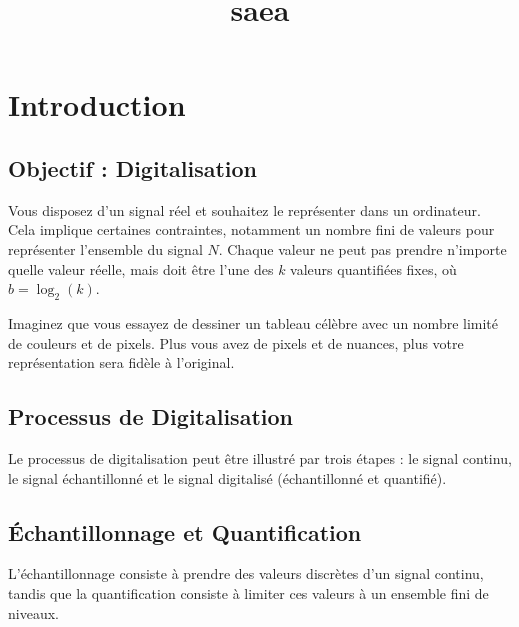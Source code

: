 \documentclass[12pt]{article}
\title{saea}
\author{}
\date{}
\begin{document}
\maketitle
\tableofcontents
\newpage

\section{Introduction}

\subsection{Objectif : Digitalisation}

Vous disposez d'un signal réel et souhaitez le représenter dans un ordinateur. Cela implique certaines contraintes, notamment un nombre fini de valeurs pour représenter l'ensemble du signal $N$. Chaque valeur ne peut pas prendre n'importe quelle valeur réelle, mais doit être l'une des $k$ valeurs quantifiées fixes, où $b = \log_2(k)$.


\begin{tcolorbox}[title={Vulgarisation simple}]
Imaginez que vous essayez de dessiner un tableau célèbre avec un nombre limité de couleurs et de pixels. Plus vous avez de pixels et de nuances, plus votre représentation sera fidèle à l'original.
\end{tcolorbox}

\subsection{Processus de Digitalisation}

Le processus de digitalisation peut être illustré par trois étapes : le signal continu, le signal échantillonné et le signal digitalisé (échantillonné et quantifié).


\subsection{Échantillonnage et Quantification}

L'échantillonnage consiste à prendre des valeurs discrètes d'un signal continu, tandis que la quantification consiste à limiter ces valeurs à un ensemble fini de niveaux.
\end{document}
